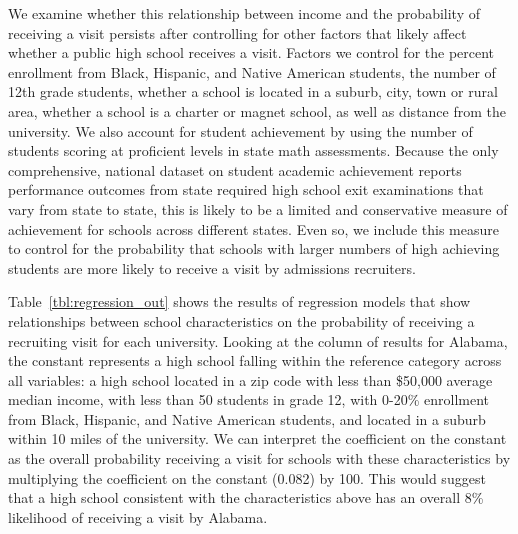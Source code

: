 \documentclass[twoside]{article}
\begin{document}



We examine whether this relationship between income and the probability of receiving a visit persists after controlling for other factors that likely affect whether a public high school receives a visit. Factors we control for the percent enrollment from Black, Hispanic, and Native American students, the number of 12th grade students, whether a school is located in a suburb, city, town or rural area, whether a school is a charter or magnet school, as well as distance from the university. We also account for student achievement by using the number of students scoring at proficient levels in state math assessments. Because the only comprehensive, national dataset on student academic achievement reports performance outcomes from state required high school exit examinations that vary from state to state, this is likely to be a limited and conservative measure of achievement for schools across different states. Even so, we include this measure to control for the probability that schools with larger numbers of high achieving students are more likely to receive a visit by admissions recruiters.

Table~\ref{tbl:regression_out} shows the results of regression models that show relationships between school characteristics on the probability of receiving a recruiting visit for each university. Looking at the column of results for Alabama, the constant represents a high school falling within the reference category across all variables: a high school located in a zip code with less than \$50,000 average median income, with less than 50 students in grade 12, with 0-20\% enrollment from Black, Hispanic, and Native American students, and located in a suburb within 10 miles of the university.  We can interpret the coefficient on the constant as the overall probability receiving a visit for schools with these characteristics by multiplying the coefficient on the constant (0.082) by 100. This would suggest that a high school consistent with the characteristics above has an overall 8\% likelihood of receiving a visit by Alabama.
\end{document}
